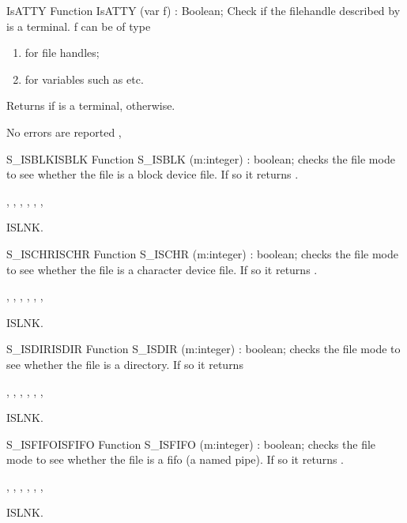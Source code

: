 \begin{function}{IsATTY}
\Declaration
Function IsATTY (var f) : Boolean;
\Description
Check if the filehandle described by  is a terminal.
f can be of type
\begin{enumerate}
\item {} for file handles;
\item {} for  variables such as  etc.
\end{enumerate}
Returns  if  is a terminal,  otherwise.

\Errors
No errors are reported
\SeeAlso
{},
\end{function}
\begin{functionl}{S\_ISBLK}{ISBLK}
\Declaration
Function S\_ISBLK (m:integer) : boolean;
\Description
  checks the file mode  to see whether the file is a
block device file. If so it returns .

\Errors
{},
 , 
 ,
 ,
 ,
 ,

\SeeAlso
ISLNK.
\end{functionl}
\begin{functionl}{S\_ISCHR}{ISCHR}
\Declaration
Function S\_ISCHR (m:integer) : boolean;
\Description
  checks the file mode  to see whether the file is a
character device file. If so it returns .

\Errors
{},
 , 
 ,
 ,
 ,
 ,

\SeeAlso
ISLNK.
\end{functionl}
\begin{functionl}{S\_ISDIR}{ISDIR}
\Declaration
Function S\_ISDIR (m:integer) : boolean;
\Description
  checks the file mode  to see whether the file is a
directory. If so it returns 

\Errors
{},
 , 
 ,
 ,
 ,
 ,

\SeeAlso
ISLNK.
\end{functionl}
\begin{functionl}{S\_ISFIFO}{ISFIFO}
\Declaration
Function S\_ISFIFO (m:integer) : boolean;
\Description
  checks the file mode  to see whether the file is a
fifo (a named pipe). If so it returns .

\Errors
{},
 , 
 ,
 ,
 ,
 ,

\SeeAlso
ISLNK.
\end{functionl}

